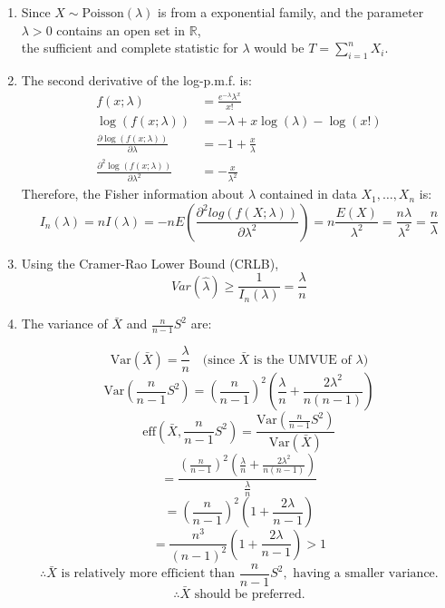 \documentclass{article}
\begin{document}
\begin{enumerate}
\begin{enumerate}[label=(\roman*)]
    \item Since $X \sim \text{Poisson}(\lambda)$ is from a exponential family, and the parameter $\lambda > 0$ contains an open set in $\mathbb{R}$, \\
    the sufficient and complete statistic for $\lambda$ would be $T = \sum_{i=1}^n X_i$.

    \item The second derivative of the log-p.m.f. is:
    \begin{align*}
    f(x; \lambda) &= \frac{e^{-\lambda} \lambda^x}{x!} \\
    \log(f(x; \lambda)) &= -\lambda + x \log(\lambda) - \log(x!) \\
    \frac{\partial \log(f(x; \lambda))}{\partial \lambda} &= -1 + \frac{x}{\lambda} \\
    \frac{\partial^2 \log(f(x; \lambda))}{\partial \lambda^2} &= -\frac{x}{\lambda^2}
    \end{align*}
    Therefore, the Fisher information about $\lambda$ contained in data $X_1, \dots, X_n$ is:
    \[
    I_n(\lambda) = nI(\lambda) = -n E(\frac{\partial^2 log(f(X; \lambda))}{\partial \lambda^2}) = n\frac{E(X)}{\lambda^2} = \frac{n\lambda}{\lambda^2} = \frac{n}{\lambda}
    \]

    \item Using the Cramer-Rao Lower Bound (CRLB),
    \[
    Var(\hat{\lambda}) \geq \frac{1}{I_n(\lambda)} = \frac{\lambda}{n}
    \]

    \item The variance of $\bar{X}$ and $\frac{n}{n-1} S^2$ are:

    \[
    \text{Var}(\bar{X}) = \frac{\lambda}{n} \quad \text{(since } \bar{X} \text{ is the UMVUE of } \lambda \text{)}
    \]
    \[
    \text{Var}\left(\frac{n}{n-1} S^2 \right) = \left(\frac{n}{n-1}\right)^2 \left( \frac{\lambda}{n} + \frac{2\lambda^2}{n(n-1)} \right)
    \]
    \[
    \text{eff}\left(\bar{X}, \frac{n}{n-1} S^2\right) = \frac{\text{Var}\left( \frac{n}{n-1} S^2 \right)}{\text{Var}(\bar{X})}
    \]
    \[
    = \frac{\left(\frac{n}{n-1}\right)^2 \left( \frac{\lambda}{n} + \frac{2\lambda^2}{n(n-1)} \right)}{\frac{\lambda}{n}}
    \]
    \[
    = \left(\frac{n}{n-1}\right)^2 \left( 1 + \frac{2\lambda}{n-1} \right)
    \]
    \[
    = \frac{n^3}{(n-1)^2} \left( 1 + \frac{2\lambda}{n-1} \right) > 1
    \]
    \[
    \therefore \bar{X} \text{ is relatively more efficient than } \frac{n}{n-1} S^2, \text{ having a smaller variance.}
    \]
    \[
    \therefore \bar{X} \text{ should be preferred.}
    \]
    \end{enumerate}


\end{enumerate}
\end{document}
